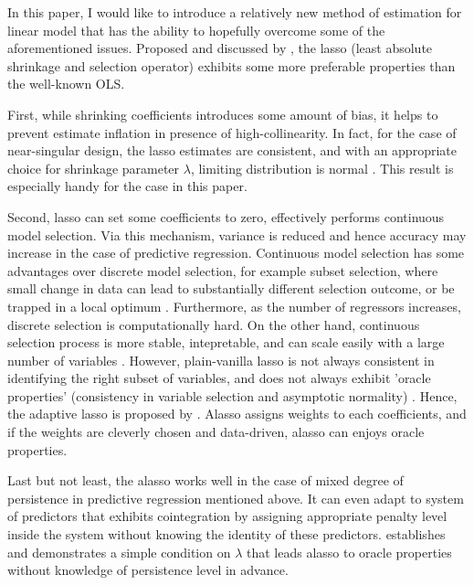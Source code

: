 \documentclass[12pt,a4paper]{article}
\begin{document}
In this paper, I would like to introduce a relatively new method of estimation for linear model that has the ability to hopefully overcome some of the aforementioned issues. Proposed and discussed by \cite{tibshirani1996regression}, the lasso (least absolute shrinkage and selection operator) exhibits some more preferable properties than the well-known OLS.

First, while shrinking coefficients introduces some amount of bias, it helps to prevent estimate inflation in presence of high-collinearity. In fact, for the case of near-singular design, the lasso estimates are consistent, and with an appropriate choice for shrinkage parameter $ \lambda $, limiting distribution is normal \citep{knight2000asymptotics, knight2008shrinkage}. This result is especially handy for the case in this paper.

Second, lasso can set some coefficients to zero, effectively performs continuous model selection. Via this mechanism, variance is reduced and hence accuracy may increase in the case of predictive regression. Continuous model selection has some advantages over discrete model selection, for example subset selection, where small change in data can lead to substantially different selection outcome, or be trapped in a local optimum \citep{breiman1995better}. Furthermore, as the number of regressors increases, discrete selection is computationally hard. On the other hand, continuous selection process is more stable, intepretable, and can scale easily with a large number of variables \citep{tibshirani1996regression}. However, plain-vanilla lasso is not always consistent in identifying the right subset of variables, and does not always exhibit 'oracle properties' (consistency in variable selection and asymptotic normality) \citep{meinshausen2004consistent, zou2006adaptive}. Hence, the adaptive lasso is proposed by \cite{zou2006adaptive}. Alasso assigns weights to each coefficients, and if the weights are cleverly chosen and data-driven, alasso can enjoys oracle properties. 

Last but not least, the alasso works well in the case of mixed degree of persistence in predictive regression mentioned above. It can even adapt to system of predictors that exhibits cointegration by assigning appropriate penalty level inside the system without knowing the identity of these predictors. \cite{lee2018lasso} establishes and demonstrates a simple condition on $\lambda$ that leads alasso to oracle properties without knowledge of persistence level in advance.
\end{document}
